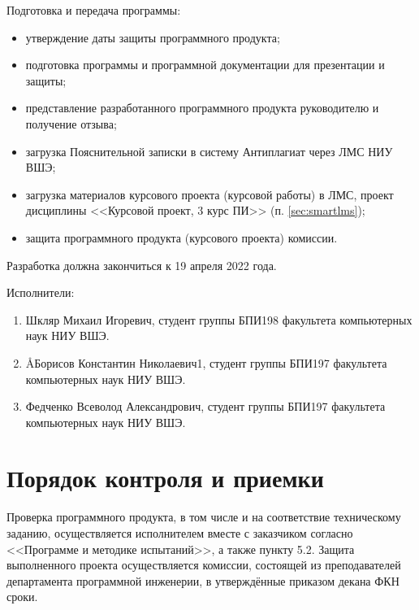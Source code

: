\documentclass[a4paper,12pt,reqno]{article}
\begin{document}
  Подготовка и передача программы:
  \begin{itemize}
    \item утверждение даты защиты программного продукта;
    \item подготовка программы и программной документации для презентации и защиты;
    \item представление разработанного программного продукта руководителю и получение отзыва;
    \item загрузка Пояснительной записки в систему Антиплагиат через ЛМС НИУ ВШЭ;
    \item загрузка материалов курсового проекта (курсовой работы) в ЛМС, проект дисциплины <<Курсовой проект, 3 курс ПИ>> (п. \ref{sec:smartlms});
    \item защита программного продукта (курсового проекта) комиссии.
  \end{itemize}
  Разработка должна закончиться к 19 апреля 2022 года.

  Исполнители:
  \begin{enumerate}
    \item Шкляр Михаил Игоревич, студент группы БПИ198 факультета компьютерных наук НИУ ВШЭ.
    \item \AA{Борисов Константин Николаевич}{1}, студент группы БПИ197 факультета компьютерных наук НИУ ВШЭ.
    \item Федченко Всеволод Александрович, студент группы БПИ197 факультета компьютерных наук НИУ ВШЭ.
  \end{enumerate}

  \section{Порядок контроля и приемки}
  Проверка программного продукта, в том числе и на соответствие техническому заданию,
  осуществляется исполнителем вместе с заказчиком согласно <<Программе и методике испытаний>>, а также пункту 5.2.
  Защита выполненного проекта осуществляется комиссии, состоящей из преподавателей департамента программной инженерии,
  в утверждённые приказом декана ФКН сроки.

  \begin{CRTbibliography}
  \end{CRTbibliography}

  \CRTlistRegistration
\end{document}

